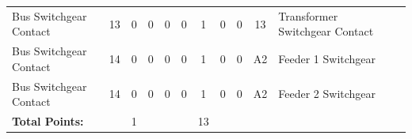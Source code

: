 \begin{table}[!htp]
{\begin{tabular}{lcccccccccll}
			Bus Switchgear Contact     & 13                      & 0                                           & 0                                          & 0           & 0           & 1            & 0                & 0 & 13                           & Transformer Switchgear Contact   &                \\
			Bus Switchgear Contact     & 14                      & 0                                           & 0                                          & 0           & 0           & 1            & 0                & 0 & A2                           & Feeder 1 Switchgear              &                \\
			Bus Switchgear Contact     & 14                      & 0                                           & 0                                          & 0           & 0           & 1            & 0                & 0 & A2                           & Feeder 2 Switchgear              &                \\ \midrule
			\textbf{Total Points:}     &                         & 1                                           &                                            &             &             & 13           &                  &   &                              &                                  &                \\ \bottomrule
		\end{tabular}
	}
\end{table}
